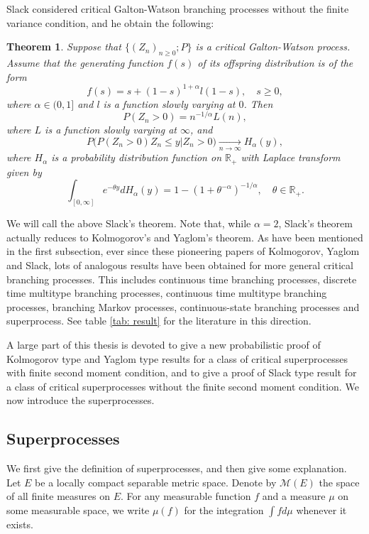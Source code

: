 \documentclass[UTF8]{pkuthss}
\theoremstyle{plain}
\newtheorem{thm}{Theorem}[section]
\theoremstyle{definition}
\numberwithin{equation}{section}
\begin{document}
	Slack \cite{Slack1968A-branching} considered critical Galton-Watson branching processes without the finite variance condition, and he obtain the following:
\begin{thm}
\label{thm: Slack result}
	Suppose that $\{(Z_n)_{n\geq 0}; P\}$ is a critical Galton-Watson process. Assume that the generating function $f(s)$ of its offspring distribution is of the form
\[
	f(s) = s + (1-s)^{1+\alpha}l(1-s),\quad s\geq 0,
\]
	where $\alpha\in (0,1]$ and $l$ is a function slowly varying at $0$.
	Then 
\[
	P(Z_n > 0) = n^{-1/\alpha} L(n),
\]
	where $L$ is a function slowly varying at $\infty$, and
\[
	P\big( P(Z_n>0)Z_n \leq y |Z_n > 0\big)\xrightarrow[n\to\infty]{} H_\alpha(y),
\]
	where $H_\alpha$ is a probability distribution function on $\mathbb R_+$ with Laplace transform given by
\[
	\int_{[0,\infty]} e^{-\theta y} dH_\alpha(y) = 1-(1+\theta^{-\alpha})^{-1/\alpha},\quad \theta \in \mathbb R_+.
\]
\end{thm}
	We will call the above Slack's theorem.
	Note that, while $\alpha = 2$, Slack's theorem actually reduces to Kolmogorov's and Yaglom's theorem. 
	As have been mentioned in the first subsection, ever since these pioneering papers of Kolmogorov, Yaglom and Slack, lots of analogous results have been obtained for more general critical branching processes.
	This includes continuous time branching processes, discrete time multitype branching processes, continuous time multitype branching processes, branching Markov processes, continuous-state branching processes and superprocess.
	See table \ref{tab: result} for the literature in this direction. 

	A large part of this thesis is devoted to give a new probabilistic proof of Kolmogorov type and Yaglom type results for a class of critical superprocesses with finite second moment condition, and to give a proof of Slack type result for a class of critical superprocesses without the finite second moment condition. 
	We now introduce the superprocesses.
\subsection{Superprocesses}
	We first give the definition of superprocesses, and then give some explanation.
	Let $E$ be a locally compact separable metric space. 
	Denote by $\mathcal M(E)$ the space of all finite measures on $E$. 
	For any measurable function $f$ and a measure $\mu$ on some measurable space, we write $\mu(f)$ for the integration $\int f d\mu$ whenever it exists. 
	
\end{document}
